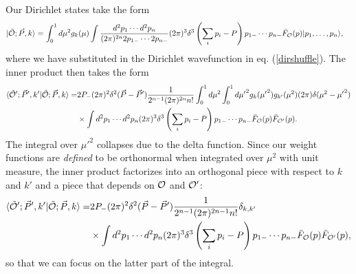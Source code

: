 \begin{subappendices}
Our Dirichlet states take the form \begin{equation}
	\begin{aligned}
		|\tilde{{\cal O}};\vec{P}, k\rangle &= \int_0^{1} d\mu^2 g_k(\mu) \int \frac{d^2p_1 \dotsb d^2p_n}{(2\pi)^{2n} 2p_{1-} \dotsb 2p_{n-}} (2\pi)^3 \delta^3\left(\sum_i p_i - P \right) p_{1-} \dotsb p_{n-} \bar{F}_{{\cal O}}(p) |p_1, \dots, p_n\rangle,
	\end{aligned}
\end{equation} where we have substituted in the Dirichlet wavefunction in eq. (\ref{dirshuffle}). The inner product then takes the form \begin{equation}
	\begin{aligned}
		\langle \tilde{{\cal O}}';\vec{P}', k'|\tilde{{\cal O}};\vec{P}, k\rangle = & 2P_- (2\pi)^2 \delta^2(\vec{P}-\vec{P}')  \frac{1}{2^{n-1} (2\pi)^{2n}  n!}\int_0^{1} d\mu^2 \int_0^{1} d{\mu'}^2 g_k({\mu'}^2) g_{k'}(\mu^2) (2\pi) \delta(\mu^2 - {\mu'}^2) \\
		&\times  \int d^2 p_1 \dotsb d^2 p_n (2\pi)^3 \delta^3\left(\sum_i p_i - P \right) p_{1-} \dotsb p_{n-} \bar{F}_{{\cal O}}(p) \bar{F}_{{\cal O}'}(p).
	\end{aligned}
\end{equation} The integral over ${\mu'}^2$ collapses due to the delta function. Since our weight functions are \textit{defined} to be orthonormal when integrated over $\mu^2$ with unit measure, the inner product factorizes into an orthogonal piece with respect to $k$ and $k'$ and a piece that depends on ${\cal O}$ and ${\cal O}'$: \begin{equation}
	\begin{aligned}
		\langle \tilde{{\cal O}}';\vec{P}', k'|\tilde{{\cal O}};\vec{P}, k\rangle = & 2P_- (2\pi)^2 \delta^2(\vec{P}-\vec{P}')  \frac{1}{2^{n-1} (2\pi)^{2n-1}  n!} \delta_{k,k'} \\
		&\times  \int d^2 p_1 \dotsb d^2 p_n (2\pi)^3 \delta^3\left(\sum_i p_i - P \right) p_{1-} \dotsb p_{n-} \bar{F}_{{\cal O}}(p) \bar{F}_{{\cal O}'}(p),
	\end{aligned}
\end{equation} so that we can focus on the latter part of the integral.



\end{subappendices}
